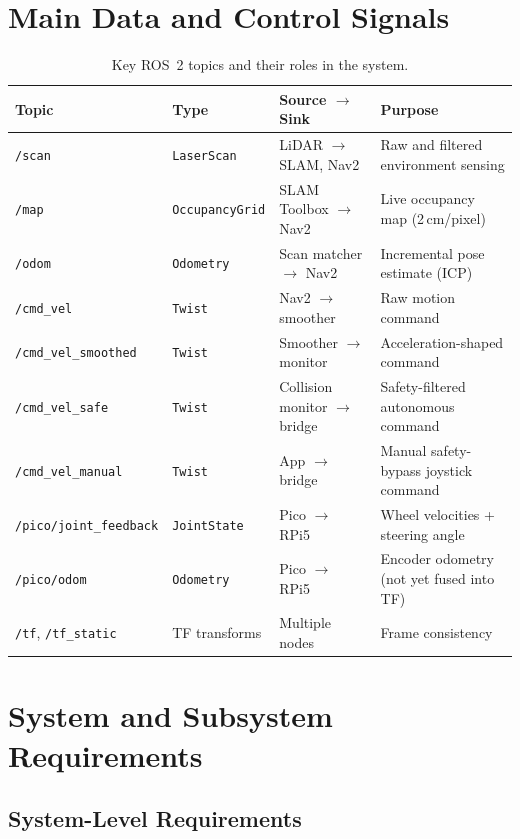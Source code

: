 \documentclass[12pt,a4paper]{report}
\begin{document}
\section{Main Data and Control Signals}

\begin{table}[H]
\centering
\caption{Key ROS~2 topics and their roles in the system.}
\label{tab:signals}
\begin{tabularx}{\textwidth}{|p{3.4cm}|p{2.2cm}|p{2.8cm}|X|}
\hline
\textbf{Topic} & \textbf{Type} & \textbf{Source $\rightarrow$ Sink} & \textbf{Purpose} \\
\hline
\texttt{/scan} & \texttt{LaserScan} & LiDAR $\rightarrow$ SLAM, Nav2 & Raw and filtered environment sensing \\
\hline
\texttt{/map} & \texttt{OccupancyGrid} & SLAM Toolbox $\rightarrow$ Nav2 & Live occupancy map (2\,cm/pixel) \\
\hline
\texttt{/odom} & \texttt{Odometry} & Scan matcher $\rightarrow$ Nav2 & Incremental pose estimate (ICP) \\
\hline
\texttt{/cmd\_vel} & \texttt{Twist} & Nav2 $\rightarrow$ smoother & Raw motion command \\
\hline
\texttt{/cmd\_vel\_smoothed} & \texttt{Twist} & Smoother $\rightarrow$ monitor & Acceleration-shaped command \\
\hline
\texttt{/cmd\_vel\_safe} & \texttt{Twist} & Collision monitor $\rightarrow$ bridge & Safety-filtered autonomous command \\
\hline
\texttt{/cmd\_vel\_manual} & \texttt{Twist} & App $\rightarrow$ bridge & Manual safety-bypass joystick command \\
\hline
\texttt{/pico/joint\_feedback} & \texttt{JointState} & Pico $\rightarrow$ RPi5 & Wheel velocities + steering angle \\
\hline
\texttt{/pico/odom} & \texttt{Odometry} & Pico $\rightarrow$ RPi5 & Encoder odometry (not yet fused into TF) \\
\hline
\texttt{/tf}, \texttt{/tf\_static} & TF transforms & Multiple nodes & Frame consistency \\
\hline
\end{tabularx}
\end{table}

\section{System and Subsystem Requirements}

\subsection{System-Level Requirements}
\end{document}

